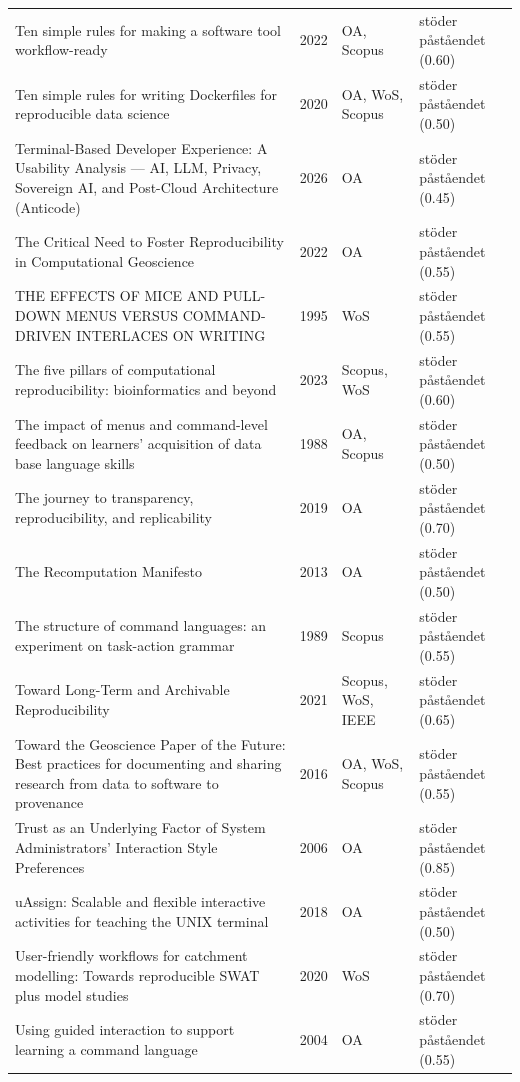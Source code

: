 \begin{longtable}{@{}%
  >{\raggedright\arraybackslash}p{}c%
  >{\raggedright\arraybackslash}p{}%
  >{\raggedright\arraybackslash}p{}@{}}
Ten simple rules for making a software tool workflow-ready & 2022 & OA, Scopus & stöder påståendet (0.60) \\
Ten simple rules for writing Dockerfiles for reproducible data science & 2020 & OA, WoS, Scopus & stöder påståendet (0.50) \\
Terminal-Based Developer Experience: A Usability Analysis --- AI, LLM, Privacy, Sovereign AI, and Post-Cloud Architecture (Anticode) & 2026 & OA & stöder påståendet (0.45) \\
The Critical Need to Foster Reproducibility in Computational Geoscience & 2022 & OA & stöder påståendet (0.55) \\
THE EFFECTS OF MICE AND PULL-DOWN MENUS VERSUS COMMAND-DRIVEN INTERLACES ON WRITING & 1995 & WoS & stöder påståendet (0.55) \\
The five pillars of computational reproducibility: bioinformatics and beyond & 2023 & Scopus, WoS & stöder påståendet (0.60) \\
The impact of menus and command-level feedback on learners' acquisition of data base language skills & 1988 & OA, Scopus & stöder påståendet (0.50) \\
The journey to transparency, reproducibility, and replicability & 2019 & OA & stöder påståendet (0.70) \\
The Recomputation Manifesto & 2013 & OA & stöder påståendet (0.50) \\
The structure of command languages: an experiment on task-action grammar & 1989 & Scopus & stöder påståendet (0.55) \\
Toward Long-Term and Archivable Reproducibility & 2021 & Scopus, WoS, IEEE & stöder påståendet (0.65) \\
Toward the Geoscience Paper of the Future: Best practices for documenting and sharing research from data to software to provenance & 2016 & OA, WoS, Scopus & stöder påståendet (0.55) \\
Trust as an Underlying Factor of System Administrators' Interaction Style Preferences & 2006 & OA & stöder påståendet (0.85) \\
uAssign: Scalable and flexible interactive activities for teaching the UNIX terminal & 2018 & OA & stöder påståendet (0.50) \\
User-friendly workflows for catchment modelling: Towards reproducible SWAT plus model studies & 2020 & WoS & stöder påståendet (0.70) \\
Using guided interaction to support learning a command language & 2004 & OA & stöder påståendet (0.55) \\

\end{longtable}
